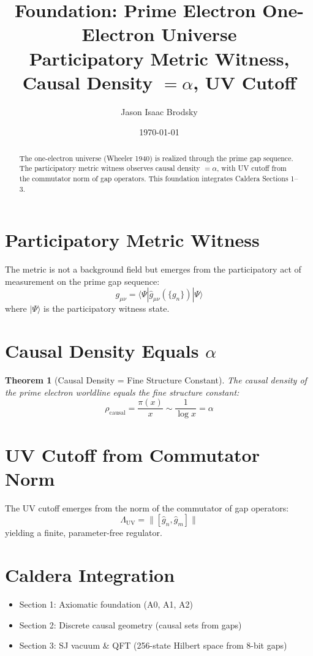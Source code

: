 \documentclass[11pt,a4paper]{article}
\title{
    \textbf{Foundation: Prime Electron One-Electron Universe} \\
    \large Participatory Metric Witness, Causal Density $=\alpha$, UV Cutoff
}
\author{Jason Isaac Brodsky}
\date{\today}
\newtheorem{theorem}{Theorem}
\begin{document}
\maketitle

\begin{abstract}
The one-electron universe (Wheeler 1940) is realized through the prime gap sequence. The participatory metric witness observes causal density $=\alpha$, with UV cutoff from the commutator norm of gap operators. This foundation integrates Caldera Sections 1--3.
\end{abstract}

\section{Participatory Metric Witness}

The metric is not a background field but emerges from the participatory act of measurement on the prime gap sequence:
\begin{equation}
    g_{\mu\nu} = \langle \Psi | \hat{g}_{\mu\nu}(\{g_n\}) | \Psi \rangle
\end{equation}
where $|\Psi\rangle$ is the participatory witness state.

\section{Causal Density Equals $\alpha$}

\begin{theorem}[Causal Density = Fine Structure Constant]
The causal density of the prime electron worldline equals the fine structure constant:
\begin{equation}
    \rho_{\mathrm{causal}} = \frac{\pi(x)}{x} \sim \frac{1}{\log x} = \alpha
\end{equation}
\end{theorem}

\section{UV Cutoff from Commutator Norm}

The UV cutoff emerges from the norm of the commutator of gap operators:
\begin{equation}
    \Lambda_{\mathrm{UV}} = \|[\hat{g}_n, \hat{g}_m]\|
\end{equation}
yielding a finite, parameter-free regulator.

\section{Caldera Integration}

\begin{itemize}
    \item Section 1: Axiomatic foundation (A0, A1, A2)
    \item Section 2: Discrete causal geometry (causal sets from gaps)
    \item Section 3: SJ vacuum \& QFT (256-state Hilbert space from 8-bit gaps)
\end{itemize}
\end{document}
